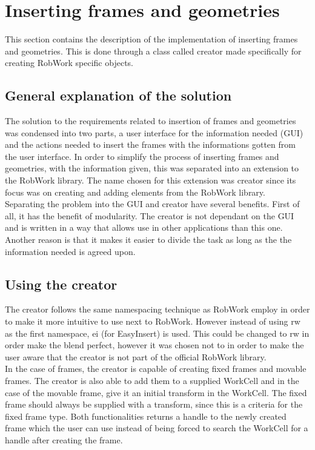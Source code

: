 \section{Inserting frames and geometries}
\label{sec:iframAGeom}
This section contains the description of the implementation of inserting frames and geometries. This is done through a class called creator made specifically for creating RobWork specific objects.

\subsection{General explanation of the solution}
\label{subsec:iFramesAGeomsGE}
The solution to the requirements related to insertion of frames and geometries was condensed into two parts, a user interface for the information needed (GUI) and the actions needed to insert the frames with the informations gotten from the user interface. In order to simplify the process of inserting frames and geometries, with the information given, this was separated into an extension to the RobWork library. The name chosen for this extension was creator since its focus was on creating and adding elements from the RobWork library.\\

Separating the problem into the GUI and creator have several benefits. First of all, it has the benefit of modularity. The creator is not dependant on the GUI and is written in a way that allows use in other applications than this one.\\
Another reason is that it makes it easier to divide the task as long as the the information needed is agreed upon.

\subsection{Using the creator}
\label{subsec:iframAGeomUsing}
The creator follows the same namespacing technique as RobWork employ in order to make it more intuitive to use next to RobWork. However instead of using rw as the first namespace, ei (for EasyInsert) is used. This could be changed to rw in order make the blend perfect, however it was chosen not to in order to make the user aware that the creator is not part of the official RobWork library.\\

In the case of frames, the creator is capable of creating fixed frames and movable frames. The creator is also able to add them to a supplied WorkCell and in the case of the movable frame, give it an initial transform in the WorkCell. The fixed frame should always be supplied with a transform, since this is a criteria for the fixed frame type. 
Both functionalities returns a handle to the newly created frame which the user can use instead of being forced to search the WorkCell for a handle after creating the frame.\\

